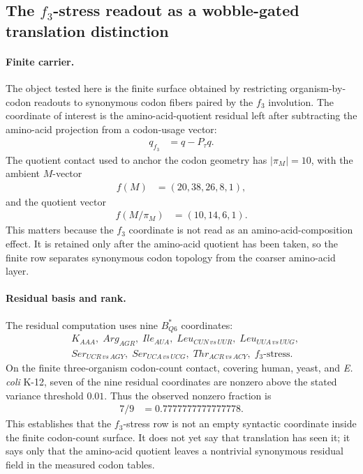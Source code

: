 \subsection{The $f_3$-stress readout as a wobble-gated translation distinction}\label{sec:q6-f3-stress-wobble-broken-translation-readout-survival-cross-layer}

\paragraph{Finite carrier.}
The object tested here is the finite surface obtained by restricting organism-by-codon readouts to synonymous codon fibers paired by the $f_3$ involution.  The coordinate of interest is the amino-acid-quotient residual left after subtracting the amino-acid projection from a codon-usage vector:
$$
\begin{aligned}
q_{f_3} &= q - P_{\tau}q .
\end{aligned}
$$
The quotient contact used to anchor the codon geometry has $|\pi_M|=10$, with the ambient $M$-vector
$$
\begin{aligned}
f(M) &= (20,38,26,8,1),
\end{aligned}
$$
and the quotient vector
$$
\begin{aligned}
f(M/\pi_M) &= (10,14,6,1).
\end{aligned}
$$
This matters because the $f_3$ coordinate is not read as an amino-acid-composition effect.  It is retained only after the amino-acid quotient has been taken, so the finite row separates synonymous codon topology from the coarser amino-acid layer.

\paragraph{Residual basis and rank.}
The residual computation uses nine $B^\ast_{Q6}$ coordinates:
$$
\begin{aligned}
&K_{AAA},\; Arg_{AGR},\; Ile_{AUA},\; Leu_{CUN\,vs\,UUR},\; Leu_{UUA\,vs\,UUG},\\
&Ser_{UCR\,vs\,AGY},\; Ser_{UCA\,vs\,UCG},\; Thr_{ACR\,vs\,ACY},\; f_3\text{-stress}.
\end{aligned}
$$
On the finite three-organism codon-count contact, covering human, yeast, and \emph{E. coli} K-12, seven of the nine residual coordinates are nonzero above the stated variance threshold $0.01$.  Thus the observed nonzero fraction is
$$
\begin{aligned}
7/9 &= 0.7777777777777778 .
\end{aligned}
$$
This establishes that the $f_3$-stress row is not an empty syntactic coordinate inside the finite codon-count surface.  It does not yet say that translation has seen it; it says only that the amino-acid quotient leaves a nontrivial synonymous residual field in the measured codon tables.

